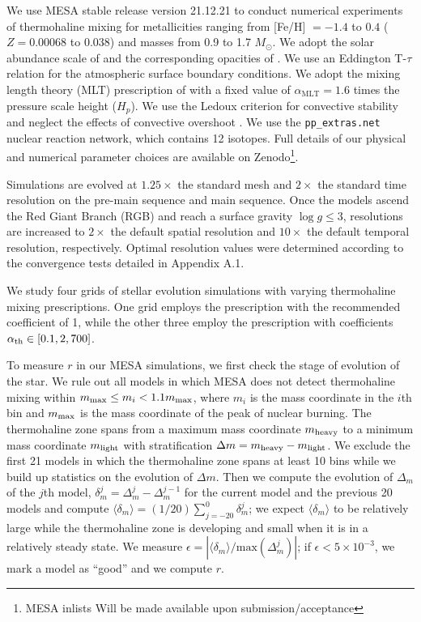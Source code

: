 We use MESA stable release version 21.12.21 to conduct numerical experiments of thermohaline mixing for metallicities ranging from [Fe/H] $= -1.4$ to $0.4$ ($Z = 0.00068$ to $0.038$) and masses from 0.9 to 1.7 $M_{\odot}$. We adopt the solar abundance scale of \citet{GrevesseSauval1998} and the corresponding opacities of \citet{IglesiasRogers1996}. We use an Eddington T-$\tau$ relation for the atmospheric surface boundary conditions.
We adopt the mixing length theory (MLT) prescription of \citet{Cox1980} with a fixed value of $\alpha_{\text{MLT}}= 1.6$ times the pressure scale height ($H_p$).  We use the Ledoux criterion for convective stability and neglect the effects of convective overshoot \citep{Ledoux}. We use the \verb|pp_extras.net| nuclear reaction network, which contains 12 isotopes. Full details of our physical and numerical parameter choices are available on Zenodo\footnote{MESA inlists Will be made available upon submission/acceptance}. 

Simulations are evolved at $1.25\times$ the standard mesh and $2\times$ the standard time resolution on the pre-main sequence and main sequence. Once the models ascend the Red Giant Branch (RGB) and reach a surface gravity $\log g \le 3$, resolutions are increased to $2\times$ the default spatial resolution and $10\times$ the default temporal resolution, respectively. Optimal resolution values were determined according to the convergence tests detailed in Appendix A.1. 

We study four grids of stellar evolution simulations with varying thermohaline mixing prescriptions. One grid employs the \citet{brown_etal_2013} prescription with the recommended coefficient of 1, while the other three employ the \citet{kippenhahn_etal_1980} prescription with coefficients $\alpha_{\rm th} \in [0.1, 2, 700]$.


To measure $r$ in our MESA simulations, we first check the stage of evolution of the star.
We rule out all models in which MESA does not detect thermohaline mixing within $m_{\rm max} \leq m_i < 1.1 m_{\rm max}$, where $m_i$ is the mass coordinate in the $i$th bin and $m_{\rm max}$ is the mass coordinate of the peak of nuclear burning.
The thermohaline zone spans from a maximum mass coordinate $m_{\rm heavy}$ to a minimum mass coordinate $m_{\rm light}$ with stratification $\Delta m = m_{\rm heavy} - m_{\rm light}$.
We exclude the first 21 models in which the thermohaline zone spans at least 10 bins while we build up statistics on the evolution of $\Delta m$.
Then we compute the evolution of $\Delta_{m}$ of the $j$th model, $\delta_m^j = \Delta_m^{j} - \Delta_m^{j-1}$ for the current model and the previous 20 models and compute $\langle \delta_m \rangle = (1/20)\sum_{j=-20}^0 \delta_m^j$; we expect $\langle \delta_m \rangle$ to be relatively large while the thermohaline zone is developing and small when it is in a relatively steady state.
We measure $\epsilon = |\langle \delta_m \rangle / \mathrm{max}(\Delta_m^j)|$; if $\epsilon < 5 \times 10^{-3}$, we mark a model as ``good'' and we compute $r$.

